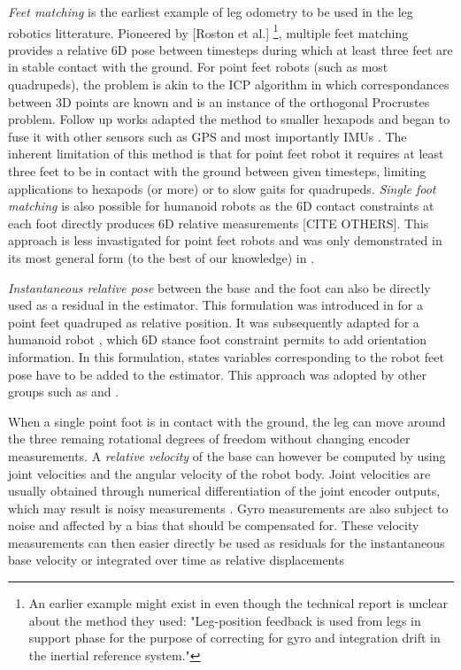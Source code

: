 \textit{Feet matching} is the earliest example of leg odometry to be used in the leg robotics litterature. Pioneered by [Roston et al.] 
\footnote{An earlier example might exist in \cite{roston1991dead} even though the technical report is unclear about the method they used: 
"Leg-position feedback is used from legs in support phase for the purpose of correcting for gyro and integration drift in the inertial reference system."},
multiple feet matching provides a relative 6D pose between timesteps during which at least three feet are in stable contact with the ground.
For point feet robots (such as most quadrupeds), the problem is akin to the ICP algorithm in which correspondances between 3D points are known and is an instance of the orthogonal Procrustes problem.
Follow up works adapted the method to smaller hexapods \cite{lin2005leg} and began to fuse it with other sensors such as GPS \cite{gassmann2005localization, cobano2008location} 
and most importantly IMUs \cite{lin2006sensor, reinstein2011dead}.
The inherent limitation of this method is that for point feet robot it requires at least three feet to be in contact with the ground between given timesteps, limiting
applications to hexapods (or more) or to slow gaits for quadrupeds.
\textit{Single foot matching} is also possible for humanoid robots as the 6D contact constraints at each foot directly produces 6D 
relative measurements \cite{flayols2017experimental} [CITE OTHERS]. This approach is less invastigated for point feet robots and was only 
demonstrated in its most general form (to the best of our knowledge) in \cite{fourmy2021contact}.

\textit{Instantaneous relative pose} between the base and the foot can also be directly used as a residual in the estimator. This formulation
was introduced in \cite{bloesch2013state} for a point feet quadruped as relative position. It was subsequently adapted for a humanoid robot \cite{rotella2014state}, 
which 6D stance foot constraint permits to add orientation information. In this formulation, states variables corresponding to the robot feet pose have to 
be added to the estimator. This approach was adopted by other groups such as \cite{hartley2018legged, hartley2018hybrid, hartley2020contact} and \cite{bledt2018cheetah}.

When a single point foot is in contact with the ground, the leg can move around the three remaing rotational degrees of freedom without changing encoder measurements.
A \textit{relative velocity} of the base can however be computed by using joint velocities and the angular velocity of the robot body. 
Joint velocities are usually obtained through numerical differentiation of the joint encoder outputs, which may result is noisy measurements \cite{rotella2016imu}.
Gyro measurements are also subject to noise and affected by a bias that should be compensated for. These velocity measurements can then easier directly be used as
residuals for the instantaneous base velocity \cite{bloesch2013stateSlippery,bledt2018cheetah} or 
integrated over time as relative displacements \cite{ma2012robust, wisth2020preintegrated}


